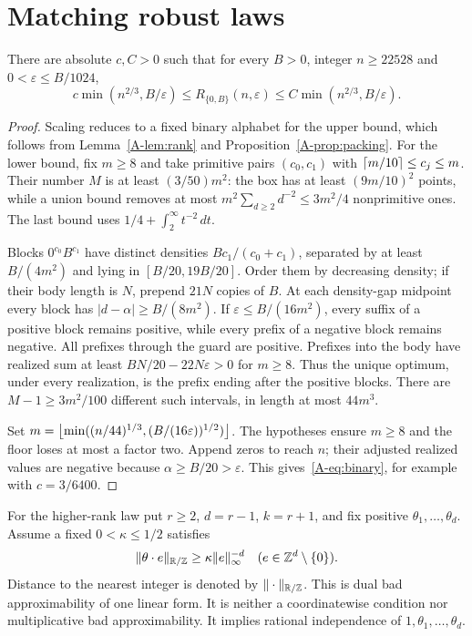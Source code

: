 \section{Matching robust laws}
\begin{theorem}\label{A-thm:binary}
There are absolute $c,C>0$ such that for every $B>0$, integer $n\ge22528$ and $0<\varepsilon\le B/1024$,
\begin{equation}\label{A-eq:binary}
c\min(n^{2/3},B/\varepsilon)\le R_{\{0,B\}}(n,\varepsilon)
\le C\min(n^{2/3},B/\varepsilon).
\end{equation}
\end{theorem}
\begin{proof}
Scaling reduces to a fixed binary alphabet for the upper bound, which follows from Lemma~\ref{A-lem:rank} and Proposition~\ref{A-prop:packing}. For the lower bound, fix $m\ge8$ and take primitive pairs $(c_0,c_1)$ with $\left\lceil m/10\right\rceil\le c_j\le m$. Their number $M$ is at least $(3/50)m^2$: the box has at least $(9m/10)^2$ points, while a union bound removes at most $m^2\sum_{d\ge2}d^{-2}\le3m^2/4$ nonprimitive ones. The last bound uses $1/4+\int_2^\infty t^{-2}\,dt$.

Blocks $0^{c_0}B^{c_1}$ have distinct densities $Bc_1/(c_0+c_1)$, separated by at least $B/(4m^2)$ and lying in $[B/20,19B/20]$. Order them by decreasing density; if their body length is $N$, prepend $21N$ copies of $B$. At each density-gap midpoint every block has $|d-\alpha|\ge B/(8m^2)$. If $\varepsilon\le B/(16m^2)$, every suffix of a positive block remains positive, while every prefix of a negative block remains negative. All prefixes through the guard are positive. Prefixes into the body have realized sum at least $BN/20-22N\varepsilon>0$ for $m\ge8$. Thus the unique optimum, under every realization, is the prefix ending after the positive blocks. There are $M-1\ge3m^2/100$ different such intervals, in length at most $44m^3$.

Set $m=\left\lfloor \min((n/44)^{1/3},(B/(16\varepsilon))^{1/2})\right\rfloor$. The hypotheses ensure $m\ge8$ and the floor loses at most a factor two. Append zeros to reach $n$; their adjusted realized values are negative because $\alpha\ge B/20>\varepsilon$. This gives~\eqref{A-eq:binary}, for example with $c=3/6400$.
\end{proof}

For the higher-rank law put $r\ge2$, $d=r-1$, $k=r+1$, and fix positive $\theta_1,\ldots,\theta_d$. Assume a fixed $0<\kappa\le1/2$ satisfies
\begin{equation}\label{A-eq:BA}
\|\theta\cdot e\|_{\mathbb R/\mathbb Z}\ge\kappa\|e\|_\infty^{-d}
\quad(e\in\mathbb Z^d\setminus\{0\}).
\end{equation}
Distance to the nearest integer is denoted by $\|\cdot\|_{\mathbb R/\mathbb Z}$. This is dual bad approximability of one linear form. It is neither a coordinatewise condition nor multiplicative bad approximability. It implies rational independence of $1,\theta_1,\ldots,\theta_d$.

